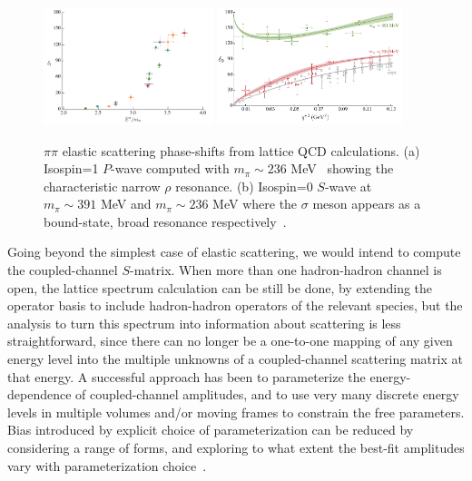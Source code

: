 {\begin{figure}
\includegraphics[width=0.44\textwidth]{dudek/bulava}
\includegraphics[width=0.48\textwidth]{dudek/sigma}
\caption{$\pi\pi$ elastic scattering phase-shifts from lattice QCD calculations. (a) Isospin=1 $P$-wave computed with $m_\pi \sim 236$ MeV~\cite{Bulava:2016mks} showing the characteristic narrow $\rho$ resonance. (b) Isospin=0 $S$-wave at $m_\pi \sim 391$ MeV and $m_\pi \sim 236$ MeV where the $\sigma$ meson appears as a bound-state, broad resonance respectively~\cite{Briceno:2016mjc}.}
\label{elastic}
\end{figure}


Going beyond the simplest case of elastic scattering, we would intend to compute the coupled-channel $S$-matrix. When more than one hadron-hadron channel is open, the lattice spectrum calculation can be still be done, by extending the operator basis to include hadron-hadron operators of the relevant species, but the analysis to turn this spectrum into information about scattering is less straightforward, since there can no longer be a one-to-one mapping of any given energy level into the multiple unknowns of a coupled-channel scattering matrix at that energy. A successful approach has been to parameterize the energy-dependence of coupled-channel amplitudes, and to use very many discrete energy levels in multiple volumes and/or moving frames to constrain the free parameters. Bias introduced by explicit choice of parameterization can be reduced by considering a range of forms, and exploring to what extent the best-fit amplitudes vary with parameterization choice~\cite{Dudek:2014qha, Wilson:2014cna, Wilson:2015dqa, Moir:2016srx, Dudek:2016cru, Briceno:2017qmb}. 

}
